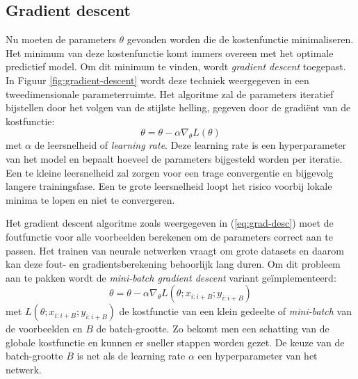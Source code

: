 \subsection{Gradient descent}
\npar Nu moeten de parameters $\theta$ gevonden worden die de kostenfunctie minimaliseren. Het minimum van deze kostenfunctie komt immers overeen met het optimale predictief model. Om dit minimum te vinden, wordt \textit{gradient descent} toegepast. In Figuur \ref{fig:gradient-descent} wordt deze techniek weergegeven in een tweedimensionale parameterruimte. Het algoritme zal de parameters iteratief bijstellen door het volgen van de stijlste helling, gegeven door de gradi\"ent van de kostfunctie:
\begin{equation}\label{eq:grad-desc}
\theta = \theta - \alpha \nabla_\theta L(\theta)
\end{equation}
met $\alpha$ de leersnelheid of \textit{learning rate}. Deze learning rate is een hyperparameter van het model en bepaalt hoeveel de parameters bijgesteld worden per iteratie. Een te kleine leersnelheid zal zorgen voor een trage convergentie en bijgevolg langere trainingsfase. Een te grote leersnelheid loopt het risico voorbij lokale minima te lopen en niet te convergeren.

\npar Het gradient descent algoritme zoals weergegeven in (\ref{eq:grad-desc}) moet de foutfunctie voor alle voorbeelden berekenen om de parameters correct aan te passen. Het trainen van neurale netwerken vraagt om grote datasets en daarom kan deze fout- en gradientsberekening behoorlijk lang duren. Om dit probleem aan te pakken wordt de \textit{mini-batch gradient descent} variant ge\"implementeerd:
\begin{equation}\label{eq:mini-grad-desc}
\theta = \theta - \alpha \nabla_\theta L(\theta;x_{i:i+B};y_{i:i+B})
\end{equation}
met $L(\theta;x_{i:i+B};y_{i:i+B})$ de kostfunctie van een klein gedeelte of \textit{mini-batch} van de voorbeelden en $B$ de batch-grootte. Zo bekomt men een schatting van de globale kostfunctie en kunnen er sneller stappen worden gezet. De keuze van de batch-grootte $B$ is net als de learning rate $\alpha$ een hyperparameter van het netwerk. 
